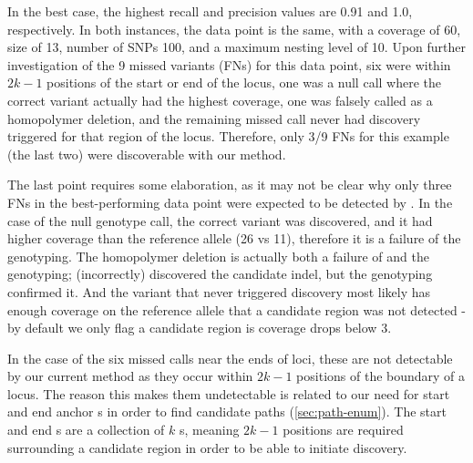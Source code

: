 In the best case, the highest recall and precision values are 0.91 and 1.0, respectively. In both instances, the data point is the same, with a coverage of 60, \kmer{} size of 13, number of SNPs 100, and a maximum nesting level of 10. Upon further investigation of the 9 missed variants (FNs) for this data point, six were within $2k-1$ positions of the start or end of the locus, one was a null call where the correct variant actually had the highest coverage, one was falsely called as a homopolymer deletion, and the remaining missed call never had \denovo{} discovery triggered for that region of the locus. Therefore, only 3/9 FNs for this example (the last two) were discoverable with our \denovo{} method.

The last point requires some elaboration, as it may not be clear why only three FNs in the best-performing data point were expected to be detected by \denovo{}. In the case of the null genotype call, the correct variant was discovered, and it had higher coverage than the reference allele (26 vs 11), therefore it is a failure of the genotyping. The homopolymer deletion is actually both a failure of \denovo{} and the genotyping; \denovo{} (incorrectly) discovered the candidate indel, but the genotyping confirmed it. And the variant that \denovo{} never triggered \denovo{} discovery most likely has enough coverage on the reference allele that a candidate region was not detected - by default we only flag a candidate region is coverage drops below 3.

In the case of the six missed calls near the ends of loci, these are not detectable by our current \denovo{} method as they occur within $2k-1$ positions of the boundary of a locus. The reason this makes them undetectable is related to our need for start and end anchor \kmer{}s in order to find candidate paths (\autoref{sec:path-enum}). The start and end \kmer{}s are a collection of $k$ \kmer{}s, meaning $2k-1$ positions are required surrounding a candidate region in order to be able to initiate \denovo{} discovery.

